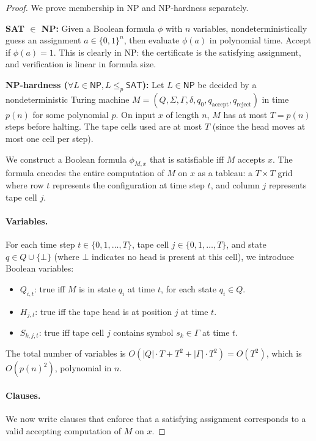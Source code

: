 \begin{proof}
We prove membership in NP and NP-hardness separately.

\textbf{SAT $\in$ NP:} Given a Boolean formula $\phi$ with $n$ variables, nondeterministically guess an assignment $a \in \{0,1\}^n$, then evaluate $\phi(a)$ in polynomial time. Accept if $\phi(a) = 1$. This is clearly in NP: the certificate is the satisfying assignment, and verification is linear in formula size.

\textbf{NP-hardness ($\forall L \in \mathsf{NP}, L \le_p \mathsf{SAT}$):} Let $L \in \mathsf{NP}$ be decided by a nondeterministic Turing machine $M = (Q, \Sigma, \Gamma, \delta, q_0, q_{\text{accept}}, q_{\text{reject}})$ in time $p(n)$ for some polynomial $p$. On input $x$ of length $n$, $M$ has at most $T = p(n)$ steps before halting. The tape cells used are at most $T$ (since the head moves at most one cell per step).

We construct a Boolean formula $\phi_{M,x}$ that is satisfiable iff $M$ accepts $x$. The formula encodes the entire computation of $M$ on $x$ as a tableau: a $T \times T$ grid where row $t$ represents the configuration at time step $t$, and column $j$ represents tape cell $j$.

\paragraph{Variables.}
For each time step $t \in \{0, 1, \dots, T\}$, tape cell $j \in \{0, 1, \dots, T\}$, and state $q \in Q \cup \{\bot\}$ (where $\bot$ indicates no head is present at this cell), we introduce Boolean variables:

\begin{itemize}
\item $Q_{i,t}$: true iff $M$ is in state $q_i$ at time $t$, for each state $q_i \in Q$.
\item $H_{j,t}$: true iff the tape head is at position $j$ at time $t$.
\item $S_{k,j,t}$: true iff tape cell $j$ contains symbol $s_k \in \Gamma$ at time $t$.
\end{itemize}

The total number of variables is $O(|Q| \cdot T + T^2 + |\Gamma| \cdot T^2) = O(T^2)$, which is $O(p(n)^2)$, polynomial in $n$.

\paragraph{Clauses.} We now write clauses that enforce that a satisfying assignment corresponds to a valid accepting computation of $M$ on $x$.


\end{proof}
